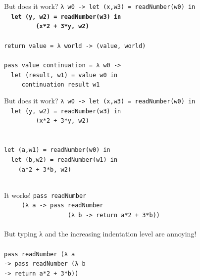 \documentclass{beamer}
\begin{document}
\begin{frame}{But does it work?}
  \texttt{λ w0 -> let (x,w3) = readNumber(w0) in\\
    \ \ \textbf{let (y, w2) = readNumber(w3) in\\
      \ \ \ \ \ \ \ \ \ (x*2 + 3*y, w2)}\\
    \ \\
    return value = λ world -> (value, world) \\
    \ \\
    pass value continuation = λ w0 -> \\
    \ \ let (result, w1) = value w0 in \\
    \ \ \ \ \ continuation result w1
  }
\end{frame}

\begin{frame}{But does it work?}
  \texttt{λ w0 -> let (x,w3) = readNumber(w0) in\\
    \ \ let (y, w2) = readNumber(w3) in\\
      \ \ \ \ \ \ \ \ \ (x*2 + 3*y, w2)\\
    \ \\ \ \\
    let (a,w1) = readNumber(w0) in \\
    \ \ let (b,w2) = readNumber(w1) in \\
    \ \ \ \ (a*2 + 3*b, w2) \\
    \ 
  }
\end{frame}

\begin{frame}{It works!}
  \texttt{pass readNumber \\
    \ \ \ \ \ (λ a -> pass readNumber \\
    \ \ \ \ \ \ \ \ \ \ \ \ \ \ \ \ \ \ (λ b -> return a*2 + 3*b))
  } \\ \ \\ \pause
  But typing λ and the increasing indentation level are annoying! \\ \pause
  \ \\
  \texttt{pass readNumber (λ a \\
    -> pass readNumber (λ b \\
    -> return a*2 + 3*b))
  } 
\end{frame}
\end{document}
